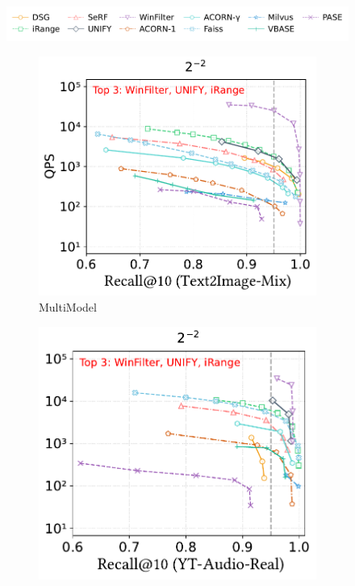 \documentclass[sigconf, nonacm]{acmart}
\begin{document}
	\begin{figure}[t]
		\centering
		
		
		\hspace*{5pt}
		\includegraphics[width=0.98\columnwidth]{figures/exp/range_legend.pdf}
		
		\begin{subfigure}[t]{0.332\columnwidth}
			\centering
			\captionsetup{font=small}
			\includegraphics[width=\linewidth]{figures/exp/range_multimodel.pdf}
			\caption{\footnotesize MultiModel}
			\label{fig:MultiModel range}
		\end{subfigure}
		\hfill
		\begin{subfigure}[t]{0.315\columnwidth}
			\centering
			\includegraphics[width=\linewidth]{figures/exp/range_85.pdf}

\end{subfigure}
\end{figure}
\end{document}
